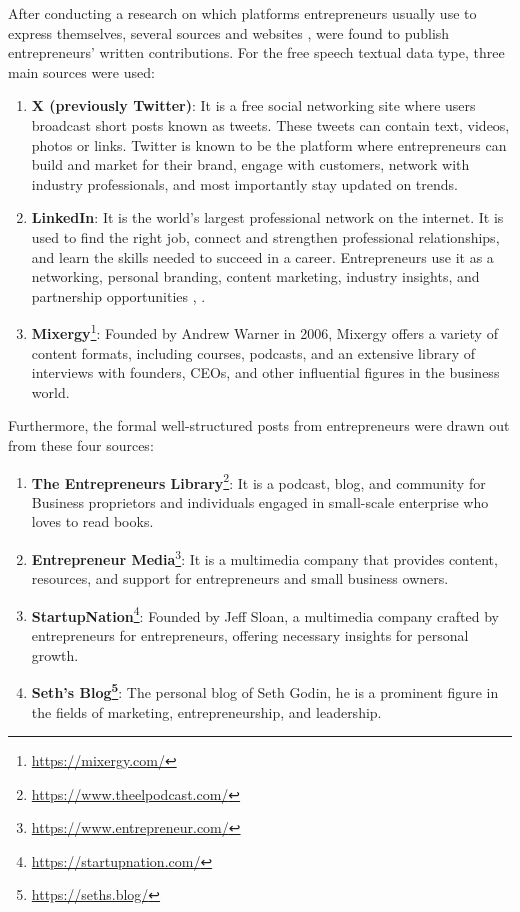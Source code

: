 After conducting a research on which platforms entrepreneurs usually use to express themselves, several sources and websites \cite{obschonka2017using},  were found to publish entrepreneurs' written contributions. For the free speech textual data type, three main sources were used:

\begin{enumerate}
\item \textbf{X (previously Twitter)}: It is a free social networking site \cite{kwak2010twitter} where users broadcast short posts known as tweets. These tweets can contain text, videos, photos or links. Twitter is known to be the platform where entrepreneurs can build and market for their brand, engage with customers, network with industry professionals, and most importantly stay updated on trends.

\item \textbf{LinkedIn}: It is the world's largest professional network on the internet. It is used to find the right job, connect and strengthen professional relationships, and learn the skills needed to succeed in a career. Entrepreneurs use it as a networking, personal branding, content marketing, industry insights, and partnership opportunities \cite{reed2018linkedin}, \cite{ioanid2015managers}.

\item \textbf{Mixergy}\footnote{\url{https://mixergy.com/}}: Founded by Andrew Warner in 2006, Mixergy offers a variety of content formats, including courses, podcasts, and an extensive library of interviews with founders, CEOs, and other influential figures in the business world.
\end{enumerate}

Furthermore, the formal well-structured posts from entrepreneurs were drawn out from these four sources:
\begin{enumerate}
\item \textbf{The Entrepreneurs Library}\footnote{\url{https://www.theelpodcast.com/}}: It is a podcast, blog, and community for Business proprietors and individuals engaged in small-scale enterprise who loves to read books.
\item \textbf{Entrepreneur Media}\footnote{\url{https://www.entrepreneur.com/}}: It is a multimedia company that provides content, resources, and support for entrepreneurs and small business owners.
\item \textbf{StartupNation}\footnote{\url{https://startupnation.com/}}: Founded by Jeff Sloan, a multimedia company crafted by entrepreneurs for entrepreneurs, offering necessary insights for personal growth.
\item \textbf{Seth's Blog\footnote{\url{https://seths.blog/}}}: The personal blog of Seth Godin, he is a prominent figure in the fields of marketing, entrepreneurship, and leadership.
\end{enumerate}

